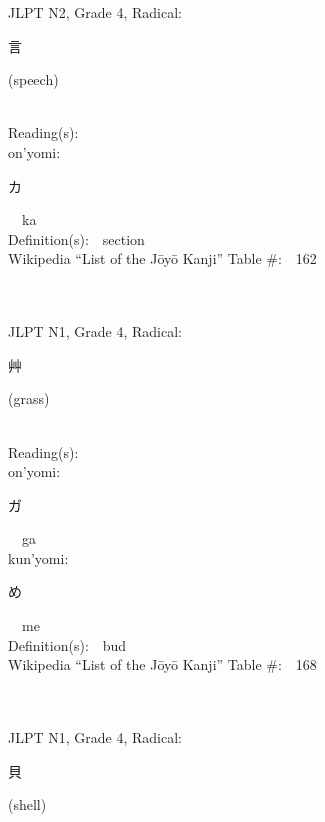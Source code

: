 \begin{multicols}{2}
{JLPT N2, Grade 4, Radical:\ \ {\begin{CJK}{UTF8}{min} 言 \end{CJK}} (speech) } \\
Reading(s):\ \ \\
{\hspace*{1em}}on'yomi:\ \ \\
{\hspace*{2em}}{\begin{CJK}{UTF8}{min} カ \end{CJK}}\ \ ka\ \ \\
Definition(s):\ \ section \\
Wikipedia ``List of the J\=oy\=o Kanji'' Table \#:\ \ 162 \\
\ \ \\
{\fontsize{34pt}{40pt}  }\ \ \\  %
{JLPT N1, Grade 4, Radical:\ \ {\begin{CJK}{UTF8}{min} 艸 \end{CJK}} (grass) } \\
Reading(s):\ \ \\
{\hspace*{1em}}on'yomi:\ \ \\
{\hspace*{2em}}{\begin{CJK}{UTF8}{min} ガ \end{CJK}}\ \ ga\ \ \\
{\hspace*{1em}}kun'yomi:\ \ \\
{\hspace*{2em}}{\begin{CJK}{UTF8}{min} め \end{CJK}}\ \ me\ \ \\
Definition(s):\ \ bud \\
Wikipedia ``List of the J\=oy\=o Kanji'' Table \#:\ \ 168 \\
\ \ \\
{\fontsize{34pt}{40pt}  }\ \ \\  %
{JLPT N1, Grade 4, Radical:\ \ {\begin{CJK}{UTF8}{min} 貝 \end{CJK}} (shell) } \\

\end{multicols}
